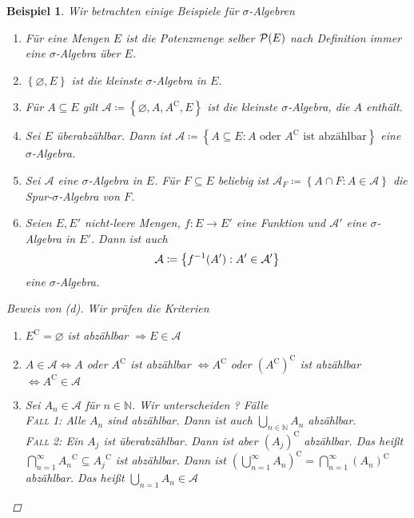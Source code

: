 \documentclass[11pt, twoside, a4paper]{article}
\theoremstyle{plain}
\newtheorem{beispiel}[blockelement]{Beispiel}
\numberwithin{equation}{subsection}
\newcommand{\set}[1]{\left\{#1\right\}}
\newcommand{\pair}[1]{\left(#1\right)}
\newcommand{\of}[1]{\mathopen{}\mathclose{}\bgroup\left(#1\aftergroup\egroup\right)}
\newcommand{\equivalent}[0]{\Leftrightarrow{}}
\newcommand{\impl}[0]{\Rightarrow{}}
\renewcommand{\emptyset}{\varnothing}
\newcommand{\comp}[1]{{#1}^{\mathrm{C}}}
\newcommand{\N}{\mathbb{N}}
\begin{document}
    \begin{beispiel}
        Wir betrachten einige Beispiele für $\sigma$-Algebren
        \begin{enumerate}[label=(\alph*)]
            \item Für eine Mengen $E$ ist die Potenzmenge selber $\mathcal{P}\of{E}$ nach Definition immer eine $\sigma$-Algebra über $E$.
            \item $\set{\emptyset, E}$ ist die kleinste $\sigma$-Algebra in $E$.
            \item Für $A \subseteq E$ gilt $\mathcal{A} \coloneqq \set{\emptyset, A, \comp{A}, E}$ ist die kleinste $\sigma$-Algebra, die $A$ enthält.
            \item Sei $E$ überabzählbar. Dann ist $\mathcal{A} \coloneqq \set{A\subseteq E: A \text{ oder }\comp{A}\text{ ist abzählbar}}$ eine $\sigma$-Algebra.
            \item Sei $\mathcal{A}$ eine $\sigma$-Algebra in $E$. Für $F\subseteq E$ beliebig ist $\mathcal{A}_F \coloneqq \set{A \cap F: A\in\mathcal{A}}$ die Spur-$\sigma$-Algebra von $F$.
            \item Seien $E, E'$ nicht-leere Mengen, $f: E\to E'$ eine Funktion und $\mathcal{A}'$ eine $\sigma$-Algebra in $E'$. Dann ist auch
            \begin{align*}
                \mathcal{A} \coloneqq \set{f^{-1}\of{A'}: A'\in\mathcal{A}'}
            \end{align*}
            eine $\sigma$-Algebra.
        \end{enumerate}

        \begin{proof}[Beweis von (d)]
            Wir prüfen die Kriterien
            \begin{enumerate}[label=(\roman*)]
                \item $\comp{E} = \emptyset$ ist abzählbar $\impl E\in\mathcal{A}$
                \item $A\in\mathcal{A} \equivalent A$ oder $\comp{A}$ ist abzählbar $\equivalent \comp{A}$ oder $\comp{\pair{\comp{A}}}$ ist abzählbar $\equivalent \comp{A} \in\mathcal{A}$
                \item Sei $A_n \in\mathcal{A}$ für $n\in\N$. Wir unterscheiden ? Fälle\\
                \textsc{Fall 1}: Alle $A_n$ sind abzählbar. Dann ist auch $\bigcup_{n\in\N} A_n$ abzählbar.\\
                \textsc{Fall 2}: Ein $A_j$ ist überabzählbar. Dann ist aber $\comp{\pair{A_j}}$ abzählbar. Das heißt $\bigcap_{n=1}^{\infty} \comp{A_n} \subseteq \comp{A_j}$ ist abzählbar. Dann ist $\comp{\pair{\bigcup_{n=1}^{\infty} A_n}} = \bigcap_{n=1}^{\infty} \comp{\pair{A_n}}$ abzählbar. Das heißt $\bigcup_{n=1} A_n \in\mathcal{A}$
            \end{enumerate}
        \end{proof}
    \end{beispiel}
    
\end{document}
